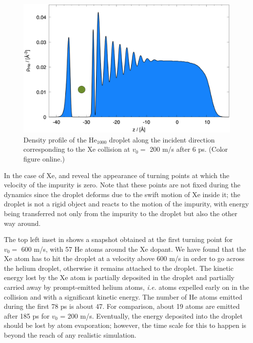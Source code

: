 \begin{figure}[!]
\centerline{\includegraphics[width=0.90\linewidth,clip]{fig4}} 
\caption{\label{fig4-headon} 
Density profile of the He$_{1000}$ droplet along the incident direction corresponding to the Xe collision at $v_0=$
 200 m/s after 6 ps. (Color figure online.)
}
\end{figure}

In the case of Xe,  and   reveal the appearance of turning points at which the velocity of the impurity is zero.
Note that these points are not fixed during the dynamics since the droplet deforms due to the swift motion of Xe inside it; 
the droplet is not a rigid object and reacts to the motion of the impurity, with  energy being transferred not only from the impurity 
to the droplet but also the other way around\citep{Mat14}.

The top left inset in  shows a snapshot obtained at the first turning point for $v_0=$ 600 m/s, with 57 He atoms around the Xe dopant.
We have found that the Xe atom has to hit the droplet at a velocity above 600 m/s  in order to go across the helium droplet, otherwise it remains attached to the droplet.
The kinetic energy lost by the Xe atom is partially deposited in the droplet and partially carried away by prompt-emitted helium atoms, \textit{i.e.} atoms expelled 
early on in the collision and with a significant kinetic energy. The number of He atoms 
 emitted during the first 78 ps is about 47. For comparison, about 19 atoms are emitted after 185 ps for $v_0$ = 200 m/s. 
 Eventually, the energy deposited into the droplet should be lost by atom evaporation; however, the time scale for this to happen is 
 beyond the reach of any realistic simulation. 
 
